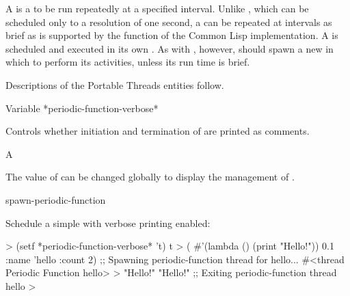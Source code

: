
%
%
A  is a  to be run repeatedly at a
specified interval.  Unlike , which can be
scheduled only to a resolution of one second, a  can
be repeated at intervals as brief as is supported by the 
function of the Common Lisp implementation.  A  is
scheduled and executed in its own .  As with
, however,  should spawn a new
 in which to perform its activities, unless its run time is
brief.

\W\entities
\T{}
\T Descriptions of the Portable Threads entities follow.
\T\clearpage


\begin{functiondoc}{Variable}%
  {*periodic-function-verbose*}{}%

\fnsyntax

\fnpurpose Controls whether initiation and termination of
  are printed as comments.

\fnpackage {}

\fnmodule {}

\fnvaluetype A 

\fninitialvalue \nil

\fndescription The value of  can be
changed globally to display the management of .

\begin{alsos}{spawn-periodic-function}
\end{alsos}

%
\fnexample 
Schedule a simple  with verbose printing enabled:
%
\W\supp
\begin{example}
  > (setf *periodic-function-verbose* 't)
  t
  > ( #'(lambda () (print "Hello!")) 0.1 
      :name 'hello
      :count 2)
  ;; Spawning periodic-function thread for hello...
  #<thread Periodic Function hello>
  >
  "Hello!" 
  "Hello!" 
  ;; Exiting periodic-function thread hello
  >
\end{example}

\end{functiondoc}

